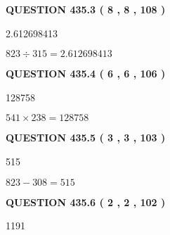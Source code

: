 \documentclass{ctexart}
\begin{document}
 
  
\vspace{0.2in}
  
{\textbf{\Large{QUESTION
435.3 
 ( 8 , 8 , 108 )
}}}
  
  
 
 
\noindent{}

2.612698413
 
 
 
 
\noindent{}

$ %
823 \div  %
315=   %
2.612698413$
 
 
  
\vspace{0.2in}
  
{\textbf{\Large{QUESTION
435.4 
 ( 6 , 6 , 106 )
}}}
  
  
 
 
\noindent{}

128758
 
 
 
 
\noindent{}

$ %
541 \times  %
238=   %
128758$
 
 
  
\vspace{0.2in}
  
{\textbf{\Large{QUESTION
435.5 
 ( 3 , 3 , 103 )
}}}
  
  
 
 
\noindent{}

515
 
 
 
 
\noindent{}

$ %
823 -  %
308=   %
515$
 
 
  
\vspace{0.2in}
  
{\textbf{\Large{QUESTION
435.6 
 ( 2 , 2 , 102 )
}}}
  
  
 
 
\noindent{}

1191
 
\end{document}
